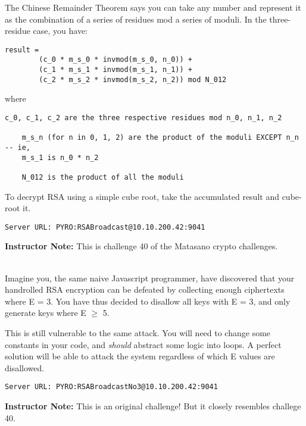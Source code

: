 \documentclass[11pt,oneside]{article}
\newcommand{\sectionfont}{phv} %
\renewcommand{\subsection}[1] {
    \vspace{12pt}{\fontfamily{\sectionfont}\selectfont\large\scshape\textbf{#1}}\\[-10pt]

}
\begin{document}
The Chinese Remainder Theorem says you can take any number and represent it as
the combination of a series of residues mod a series of moduli. In the
three-residue case, you have:
\begin{lstlisting}[language={}]
	result = 
		(c_0 * m_s_0 * invmod(m_s_0, n_0)) + 
		(c_1 * m_s_1 * invmod(m_s_1, n_1)) + 
		(c_2 * m_s_2 * invmod(m_s_2, n_2)) mod N_012
\end{lstlisting}

where

\begin{lstlisting}[language={}]
	c_0, c_1, c_2 are the three respective residues mod n_0, n_1, n_2

	m_s_n (for n in 0, 1, 2) are the product of the moduli EXCEPT n_n -- ie,
	m_s_1 is n_0 * n_2

	N_012 is the product of all the moduli
\end{lstlisting}

To decrypt RSA using a simple cube root, take the accumulated result and
cube-root it.

\begin{verbatim}
Server URL: PYRO:RSABroadcast@10.10.200.42:9041
\end{verbatim}

\ifinstructornotes
\textbf{Instructor Note:} This is challenge 40 of the Matasano crypto
challenges.
\fi

\subsection{Part 2: E $\neq$ 3 Broadcast Attack}

Imagine you, the same naive Javascript programmer, have discovered that your
handrolled RSA encryption can be defeated by collecting enough ciphertexts where
E = 3. You have thus decided to disallow all keys with E = 3, and only
generate keys where E $\geq$ 5.

This is still vulnerable to the same attack. You will need to change some
constants in your code, and \textit{should} abstract some logic into loops. A
perfect solution will be able to attack the system regardless of which E values
are disallowed.

\begin{verbatim}
Server URL: PYRO:RSABroadcastNo3@10.10.200.42:9041
\end{verbatim}

\ifinstructornotes
\textbf{Instructor Note:} This is an original challenge! But it closely
resembles challege 40.
\fi
\end{document}
